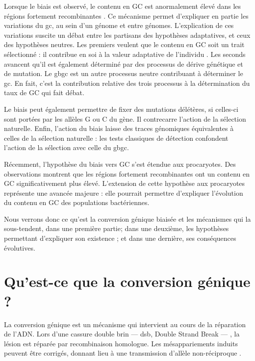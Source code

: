 \documentclass[11pt, oneside]{scrartcl}
\begin{document}
Lorsque le biais est observé, le contenu en GC est anormalement élevé dans les
régions fortement recombinantes \cite{duret_impact_2008}. Ce mécanisme permet
d'expliquer en partie les variations du \ac{gc}, au sein d'un génome et entre
génomes. L'explication de ces variations suscite un débat entre les partisans
des hypothèses adaptatives, et ceux des hypothèses neutres. Les premiers veulent
que le contenu en GC soit un trait sélectionné : il contribue en soi à la valeur
adaptative de l'individu \cite{hildebrand_evidence_2010}. Les seconds avancent
qu'il est également déterminé par des processus de dérive génétique et de
mutation. Le \ac{gbgc} est un autre processus neutre contribuant à déterminer le
\ac{gc}. En fait, c'est la contribution relative des trois processus à la
détermination du taux de GC qui fait débat.

Le biais peut également permettre de fixer des mutations délétères, si celles-ci
sont portées par les allèles G ou C du gène. Il contrecarre l'action de la
sélection naturelle\cite{galtier_gc-biased_2009, galtier_adaptation_2007}.
Enfin, l'action du biais laisse des traces génomiques équivalentes à celles de
la sélection naturelle : les tests classiques de détection confondent l'action
de la sélection avec celle du \ac{gbgc}\cite{ratnakumar_detecting_2010}.

Récemment, l'hypothèse du biais vers GC s'est étendue aux
procaryotes\cite{lassalle_gc-content_2015}. Des observations montrent que les
régions fortement recombinantes ont un contenu en GC significativement plus
élevé. L'extension de cette hypothèse aux procaryotes représente une avancée
majeure : elle pourrait permettre d'expliquer l'évolution du contenu en GC des
populations bactériennes.

Nous verrons donc ce qu'est la conversion génique biaisée et les mécanismes qui
la sous-tendent, dans une première partie; dans une deuxième, les hypothèses
permettant d'expliquer son existence ; et dans une dernière, ses conséquences
évolutives.

\section{Qu'est-ce que la conversion génique ?}
\label{sec:orgheadline8}

La conversion génique est un mécanisme qui intervient au cours de la réparation
de l'ADN. Lors d'une cassure double brin --- \ac{dsb}, Double Strand Break --- ,
la lésion est réparée par recombinaison homologue. Les mésappariements induits
peuvent être corrigés, donnant lieu à une transmission d'allèle non-réciproque
\cite{chen_mechanism_2008}.
\end{document}
